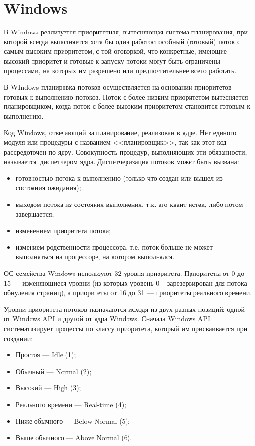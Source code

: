 \section{Windows}

В Windows реализуется приоритетная, вытесняющая система планирования, при которой всегда выполняется хотя бы один работоспособный (готовый) поток с самым высоким приоритетом, с той оговоркой, что конкретные, имеющие высокий приоритет и готовые к запуску потоки могут быть ограничены процессами, на ко­торых им разрешено или предпочтительнее всего работать. 

В WIndows планировка потоков осуществляется на основании приоритетов готовых к выполнению потоков. Поток с более низким приоритетом вытесняется планировщиком, когда поток с более высоким приоритетом становится готовым к выполнению.

Код Windows, отвечающий за планирование, реализован в ядре. Нет единого модуля или процедуры с названием <<планировщик>>, так как этот код рассредоточен по ядру. Совокупность процедур, выполняющих эти обязанности, называется диспетчером ядра. Диспетчеризация потоков может быть вызвана:
\begin{itemize}[label=---]
	\item готовностью потока к выполнению (только что создан или вышел из состояния ожидания);
	\item выходом потока из состояния выполнения, т.к. его квант истек, либо потом завершается;
	\item изменением приоритета потока;
	\item измением родственности процессора, т.е. поток больше не может выполняться на процессоре, на котором выполнялся. 
\end{itemize}


ОС семейства Windows используют 32 уровня приоритета.
Приоритеты от 0 до 15 --- изменяющиеся уровни (из которых уровень 0 -- зарезервирован для потока обнуления страниц), а приоритеты от 16 до 31 --- приоритеты реального времени.


Уровни приоритета потоков назначаются исходя из двух разных позиций: одной от Windows API и другой от ядра Windows. Сначала Windows API систематизирует процессы по классу приоритета, который им присваивается при создании:
\begin{itemize}[label=---]
	\item Простоя --- Idle (1);
	\item Обычный --- Normal (2);
	\item Высокий --- High (3);
	\item Реального времени --- Real-time (4);
	\item Ниже обычного --- Below Normal (5);
	\item Выше обычного --- Above Normal (6).
\end{itemize}

